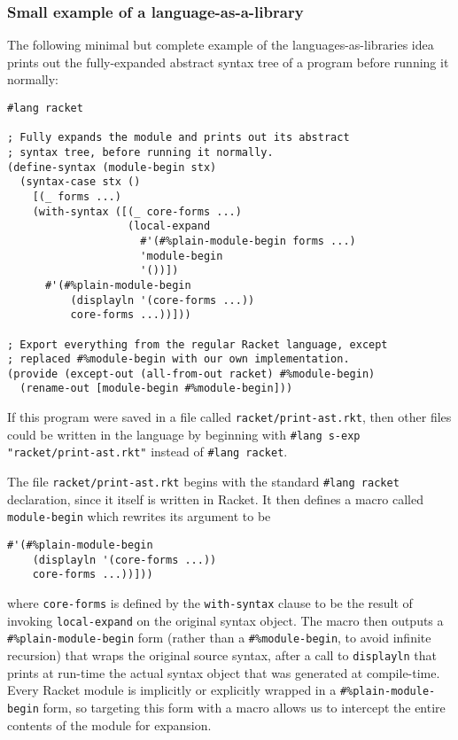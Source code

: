 \documentclass{article}
\begin{document}
\subsubsection{Small example of a language-as-a-library}
The following minimal but complete example of the languages-as-libraries idea prints out the fully-expanded abstract syntax tree of a program before running it normally:

\begin{lstlisting}
#lang racket

; Fully expands the module and prints out its abstract
; syntax tree, before running it normally.
(define-syntax (module-begin stx)
  (syntax-case stx ()
    [(_ forms ...)
    (with-syntax ([(_ core-forms ...)
                   (local-expand
                     #'(#%plain-module-begin forms ...)
                     'module-begin
                     '())])
      #'(#%plain-module-begin
          (displayln '(core-forms ...))
          core-forms ...))]))

; Export everything from the regular Racket language, except
; replaced #%module-begin with our own implementation.
(provide (except-out (all-from-out racket) #%module-begin)
  (rename-out [module-begin #%module-begin]))
\end{lstlisting}

If this program were saved in a file called \texttt{racket/print-ast.rkt}, then other files could be written in the language by beginning with \texttt{\#lang s-exp "racket/print-ast.rkt"} instead of \texttt{\#lang racket}.

The file \texttt{racket/print-ast.rkt} begins with the standard \texttt{\#lang racket} declaration, since it itself is written in Racket. It then defines a macro called \texttt{module-begin} which rewrites its argument to be

\begin{lstlisting}
#'(#%plain-module-begin
    (displayln '(core-forms ...))
    core-forms ...))]))
\end{lstlisting}

where \texttt{core-forms} is defined by the \texttt{with-syntax} clause to be the result of invoking \texttt{local-expand} on the original syntax object. The macro then outputs a \texttt{\#\%plain-module-begin} form (rather than a \texttt{\#\%module-begin}, to avoid infinite recursion) that wraps the original source syntax, after a call to \texttt{displayln} that prints at run-time the actual syntax object that was generated at compile-time. Every Racket module is implicitly or explicitly wrapped in a \texttt{\#\%plain-module-begin} form, so targeting this form with a macro allows us to intercept the entire contents of the module for expansion.
\end{document}
